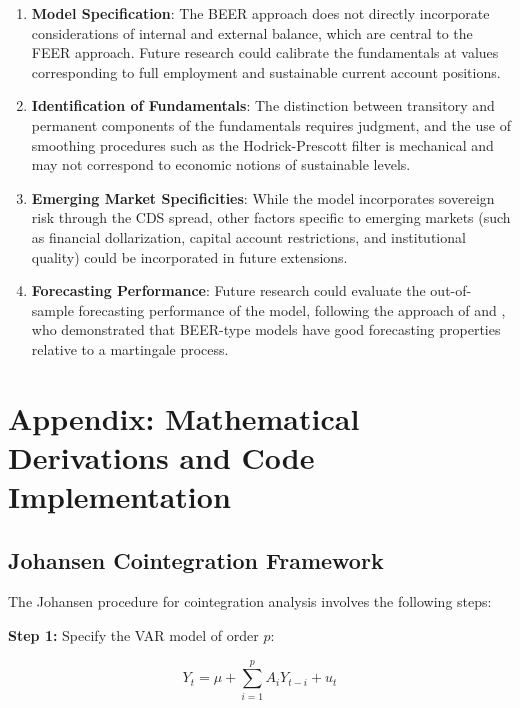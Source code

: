 \documentclass[11pt,a4paper]{article}
\begin{document}
\begin{enumerate}[label=\textbf{\arabic*.}]
    \item \textbf{Model Specification}: The BEER approach does not directly incorporate considerations of internal and external balance, which are central to the FEER approach. Future research could calibrate the fundamentals at values corresponding to full employment and sustainable current account positions.
    
    \item \textbf{Identification of Fundamentals}: The distinction between transitory and permanent components of the fundamentals requires judgment, and the use of smoothing procedures such as the Hodrick-Prescott filter is mechanical and may not correspond to economic notions of sustainable levels.
    
    \item \textbf{Emerging Market Specificities}: While the model incorporates sovereign risk through the CDS spread, other factors specific to emerging markets (such as financial dollarization, capital account restrictions, and institutional quality) could be incorporated in future extensions.
    
    \item \textbf{Forecasting Performance}: Future research could evaluate the out-of-sample forecasting performance of the model, following the approach of \cite{MacDonald1997a} and \cite{MacDonaldMarsh1997}, who demonstrated that BEER-type models have good forecasting properties relative to a martingale process.
\end{enumerate}

\newpage

\section{Appendix: Mathematical Derivations and Code Implementation}

\subsection{Johansen Cointegration Framework}

The Johansen procedure for cointegration analysis involves the following steps:

\textbf{Step 1:} Specify the VAR model of order $p$:

\begin{equation}
Y_t = \mu + \sum_{i=1}^{p} A_i Y_{t-i} + u_t
\end{equation}
\end{document}
